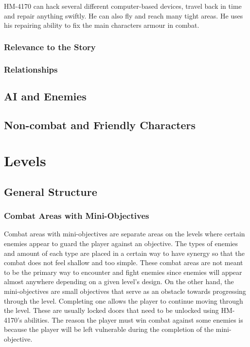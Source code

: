 \documentclass[12pt]{article}
\begin{document}
HM-4170 can hack several different computer-based devices, travel back in time and repair anything swiftly. He can also fly and reach many tight areas. He uses his repairing ability to fix the main characters armour in combat. 

\subsubsection{Relevance to the Story}

\subsubsection{Relationships}

\subsection{AI and Enemies}

\subsection{Non-combat and Friendly Characters}

\section{Levels}

\subsection{General Structure}

\subsubsection{Combat Areas with Mini-Objectives}

Combat areas with mini-objectives are separate areas on the levels where certain enemies appear to guard the player against an objective. The types of enemies and amount of each type are placed in a certain way to have synergy so that the combat does not feel shallow and too simple. These combat areas are not meant to be the primary way to encounter and fight enemies since enemies will appear almost anywhere depending on a given level's design. On the other hand, the mini-objectives are small objectives that serve as an obstacle towards progressing through the level. Completing one allows the player to continue moving through the level. These are usually locked doors that need to be unlocked using HM-4170's abilities. The reason the player must win combat against some enemies is because the player will be left vulnerable during the completion of the mini-objective.
\end{document}
